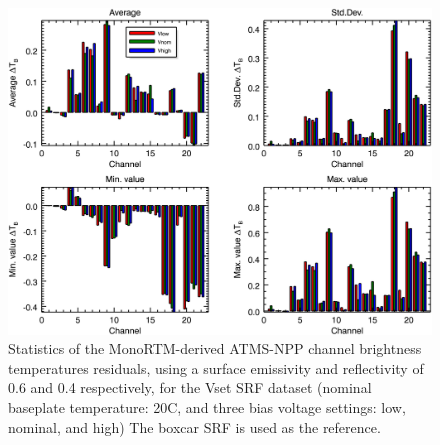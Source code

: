 \begin{figure}[H]
  \centering
    \includegraphics[bb=0 0 416 333,clip,scale=0.9]{graphics/dtb/Vset/e0.6_r0.4/stats_ref-boxcar.png} 
  \caption{Statistics of the MonoRTM-derived ATMS-NPP channel brightness temperatures residuals, using a surface emissivity and reflectivity of 0.6 and 0.4 respectively, for the Vset SRF dataset (nominal baseplate temperature: 20\textdegree{}C, and three bias voltage settings: low, nominal, and high) The boxcar SRF is used as the reference.}
  \label{fig:Vset_e0.6_r0.4_stats_ref-boxcar}
\end{figure}


